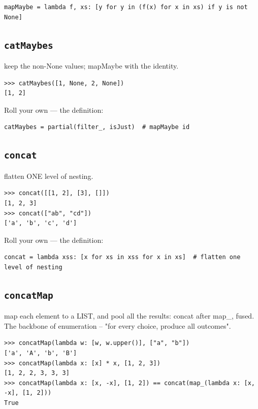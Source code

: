 \documentclass[10pt,letterpaper]{book}
\begin{document}
\begin{lstlisting}[style=ex]
mapMaybe = lambda f, xs: [y for y in (f(x) for x in xs) if y is not None]
\end{lstlisting}
\subsection{\texttt{catMaybes}}\label{def:catMaybes}
keep the non-None values; mapMaybe with the identity.
\begin{lstlisting}[style=ex]
>>> catMaybes([1, None, 2, None])
[1, 2]
\end{lstlisting}

Roll your own --- the definition:

\begin{lstlisting}[style=ex]
catMaybes = partial(filter_, isJust)  # mapMaybe id
\end{lstlisting}

\subsection{\texttt{concat}}\label{def:concat}
flatten ONE level of nesting.
\begin{lstlisting}[style=ex]
>>> concat([[1, 2], [3], []])
[1, 2, 3]
>>> concat(["ab", "cd"])
['a', 'b', 'c', 'd']
\end{lstlisting}

Roll your own --- the definition:

\begin{lstlisting}[style=ex]
concat = lambda xss: [x for xs in xss for x in xs]  # flatten one level of nesting
\end{lstlisting}
\subsection{\texttt{concatMap}}\label{def:concatMap}
map each element to a LIST, and pool all the results: concat after map\_, fused. The backbone of enumeration -- "for every choice, produce all outcomes".
\begin{lstlisting}[style=ex]
>>> concatMap(lambda w: [w, w.upper()], ["a", "b"])
['a', 'A', 'b', 'B']
>>> concatMap(lambda x: [x] * x, [1, 2, 3])
[1, 2, 2, 3, 3, 3]
>>> concatMap(lambda x: [x, -x], [1, 2]) == concat(map_(lambda x: [x, -x], [1, 2]))
True
\end{lstlisting}
\end{document}
